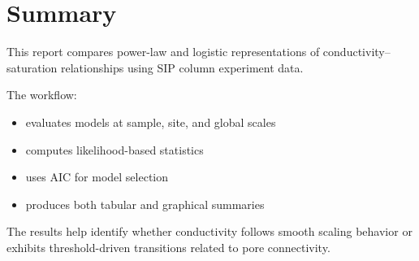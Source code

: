 \documentclass[11pt]{article}
\begin{document}
\section{Summary}

This report compares power-law and logistic representations of conductivity–saturation relationships using SIP column experiment data.

The workflow:

\begin{itemize}

\item evaluates models at sample, site, and global scales
\item computes likelihood-based statistics
\item uses AIC for model selection
\item produces both tabular and graphical summaries
\end{itemize}

The results help identify whether conductivity follows smooth scaling behavior or exhibits threshold-driven transitions related to pore connectivity.
\end{document}
